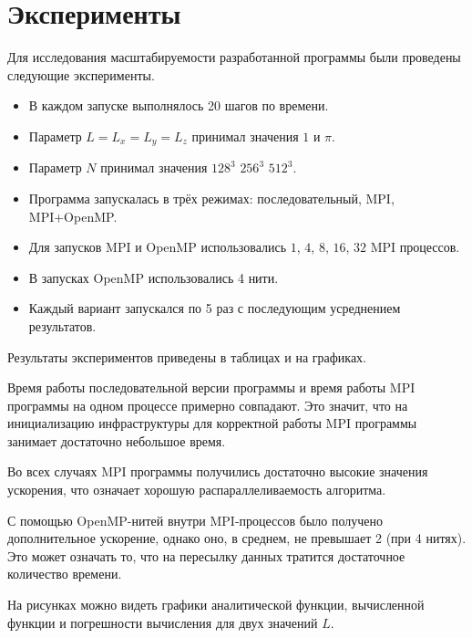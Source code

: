 \section{Эксперименты}
\label{sec:Results} 

Для исследования масштабируемости разработанной программы были проведены следующие эксперименты.

\begin{itemize}
    \item В каждом запуске выполнялось 20 шагов по времени.
    \item Параметр $L = L_x = L_y = L_z$ принимал значения $1$ и $\pi$.
    \item Параметр $N$ принимал значения $128^3$ $256^3$ $512^3$.
    \item Программа запускалась в трёх режимах: последовательный, MPI, MPI+OpenMP.
    \item Для запусков MPI и OpenMP использовались $1$, $4$, $8$, $16$, $32$ MPI процессов.
    \item В запусках OpenMP использовались 4 нити.
    \item Каждый вариант запускался по 5 раз с последующим усреднением результатов.
\end{itemize}

Результаты экспериментов приведены в таблицах и на графиках.

Время работы последовательной версии программы и время работы MPI программы на одном процессе примерно совпадают.
Это значит, что на инициализацию инфраструктуры для корректной работы MPI программы занимает достаточно небольшое время.

Во всех случаях MPI программы получились достаточно высокие значения ускорения, что означает хорошую распараллеливаемость алгоритма.

С помощью OpenMP-нитей внутри MPI-процессов было получено дополнительное ускорение, однако оно, в среднем, не превышает 2 (при 4 нитях).
Это может означать то, что на пересылку данных тратится достаточное количество времени.

На рисунках можно видеть графики аналитической функции, вычисленной функции и погрешности вычисления для двух значений $L$.
